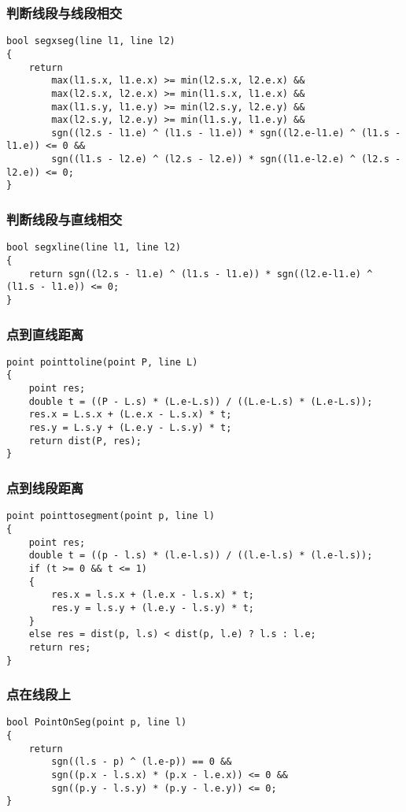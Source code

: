 \documentclass[a4]{article}
\begin{document}
\subsubsection{判断线段与线段相交}
\begin{lstlisting}
bool segxseg(line l1, line l2)
{
    return
        max(l1.s.x, l1.e.x) >= min(l2.s.x, l2.e.x) &&
        max(l2.s.x, l2.e.x) >= min(l1.s.x, l1.e.x) &&
        max(l1.s.y, l1.e.y) >= min(l2.s.y, l2.e.y) &&
        max(l2.s.y, l2.e.y) >= min(l1.s.y, l1.e.y) &&
        sgn((l2.s - l1.e) ^ (l1.s - l1.e)) * sgn((l2.e-l1.e) ^ (l1.s - l1.e)) <= 0 &&
        sgn((l1.s - l2.e) ^ (l2.s - l2.e)) * sgn((l1.e-l2.e) ^ (l2.s - l2.e)) <= 0;
}
\end{lstlisting}
\subsubsection{判断线段与直线相交}
\begin{lstlisting}
bool segxline(line l1, line l2)
{
    return sgn((l2.s - l1.e) ^ (l1.s - l1.e)) * sgn((l2.e-l1.e) ^ (l1.s - l1.e)) <= 0;
}
\end{lstlisting}
\subsubsection{点到直线距离}
\begin{lstlisting}
point pointtoline(point P, line L)
{
    point res;
    double t = ((P - L.s) * (L.e-L.s)) / ((L.e-L.s) * (L.e-L.s));
    res.x = L.s.x + (L.e.x - L.s.x) * t;
    res.y = L.s.y + (L.e.y - L.s.y) * t;
    return dist(P, res);
}
\end{lstlisting}
\subsubsection{点到线段距离}
\begin{lstlisting}
point pointtosegment(point p, line l)
{
    point res;
    double t = ((p - l.s) * (l.e-l.s)) / ((l.e-l.s) * (l.e-l.s));
    if (t >= 0 && t <= 1)
    {
        res.x = l.s.x + (l.e.x - l.s.x) * t;
        res.y = l.s.y + (l.e.y - l.s.y) * t;
    }
    else res = dist(p, l.s) < dist(p, l.e) ? l.s : l.e;
    return res;
}
\end{lstlisting}
\subsubsection{点在线段上}
\begin{lstlisting}
bool PointOnSeg(point p, line l)
{
    return
        sgn((l.s - p) ^ (l.e-p)) == 0 &&
        sgn((p.x - l.s.x) * (p.x - l.e.x)) <= 0 &&
        sgn((p.y - l.s.y) * (p.y - l.e.y)) <= 0;
}
\end{lstlisting}
\end{document}
